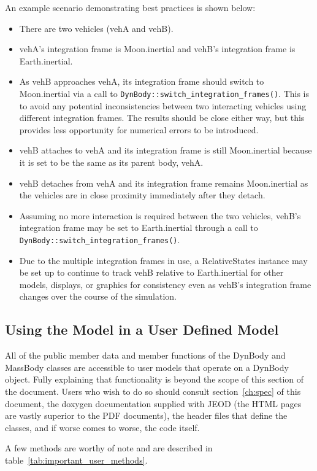 An example scenario demonstrating best practices is shown below:
\begin{itemize}
\item There are two vehicles (vehA and vehB).
\item vehA's integration frame is Moon.inertial and vehB's integration frame is Earth.inertial.
\item As vehB approaches vehA, its integration frame should switch to Moon.inertial via a call to \verb+DynBody::switch_integration_frames()+. This is to avoid any potential inconsistencies between two interacting vehicles using different integration frames. The results should be close either way, but this provides less opportunity for numerical errors to be introduced.
\item vehB attaches to vehA and its integration frame is still Moon.inertial because it is set to be the same as its parent body, vehA.
\item vehB detaches from vehA and its integration frame remains Moon.inertial as the vehicles are in close proximity immediately after they detach.
\item Assuming no more interaction is required between the two vehicles, vehB's integration frame may be set to Earth.inertial through a call to \verb+DynBody::switch_integration_frames()+.
\item Due to the multiple integration frames in use, a RelativeStates instance may be set up to continue to track vehB relative to Earth.inertial for other models, displays, or graphics for consistency even as vehB's integration frame changes over the course of the simulation.
\end{itemize}

\subsection{Using the Model in a User Defined Model}
All of the public member data and member functions of the DynBody
 and MassBody classes are accessible to user models that operate
on a DynBody object. Fully explaining that functionality is beyond
the scope of this section of the document. Users who wish to do so should
consult section~\ref{ch:spec} of this document, the doxygen documentation
supplied with JEOD (the HTML pages are vastly superior to the PDF documents),
the header files that define the classes, and if worse comes to worse,
the code itself.

A few methods are worthy of note and are described in
table~\ref{tab:important_user_methods}.

